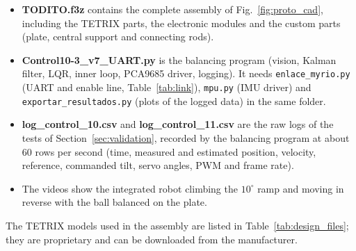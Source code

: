 \documentclass[11pt,letterpaper]{article}
\begin{document}
\begin{itemize}
    \item \textbf{TODITO.f3z} contains the complete assembly of
    Fig.~\ref{fig:proto_cad}, including the TETRIX parts, the
    electronic modules and the custom parts (plate, central support and
    connecting rods).
    \item \textbf{Control10-3\_v7\_UART.py} is the balancing program
    (vision, Kalman filter, LQR, inner loop, PCA9685 driver, logging). It
    needs \texttt{enlace\_myrio.py} (UART and enable line, Table~\ref{tab:link}),
    \texttt{mpu.py} (IMU driver) and \texttt{exportar\_resultados.py}
    (plots of the logged data) in the same folder.
    \item \textbf{log\_control\_10.csv} and \textbf{log\_control\_11.csv}
    are the raw logs of the tests of Section~\ref{sec:validation}, recorded
    by the balancing program at about 60 rows per second (time, measured
    and estimated position, velocity, reference, commanded tilt, servo
    angles, PWM and frame rate).
    \item The videos show the integrated robot climbing the $10^\circ$ ramp
    and moving in reverse with the ball balanced on the plate.
\end{itemize}

The TETRIX models used in the assembly are listed in
Table~\ref{tab:design_files}; they are proprietary and can be downloaded
from the manufacturer.
\end{document}
